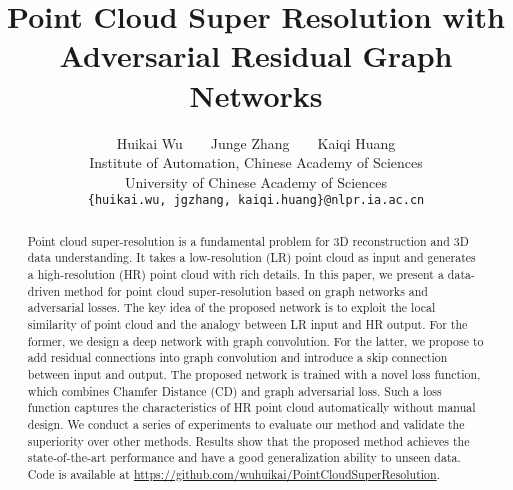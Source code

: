 \documentclass[10pt,twocolumn,letterpaper]{article}
\begin{document}
\title{Point Cloud Super Resolution with Adversarial Residual Graph Networks}

\author{Huikai Wu~~~~Junge Zhang~~~~Kaiqi Huang\\
Institute of Automation, Chinese Academy of Sciences\\
University of Chinese Academy of Sciences\\
{\tt\small\{huikai.wu, jgzhang, kaiqi.huang\}@nlpr.ia.ac.cn}
}

\maketitle



\begin{abstract}
Point cloud super-resolution is a fundamental problem for 3D reconstruction and 3D data understanding.
It takes a low-resolution (LR) point cloud as input and generates a high-resolution (HR) point cloud with rich details.
In this paper, we present a data-driven method for point cloud super-resolution based on graph networks and adversarial losses.
The key idea of the proposed network is to exploit the local similarity of point cloud and the analogy between LR input and HR output.
For the former, we design a deep network with graph convolution.
For the latter, we propose to add residual connections into graph convolution and introduce a skip connection between input and output.
The proposed network is trained with a novel loss function, which combines Chamfer Distance (CD) and graph adversarial loss.
Such a loss function captures the characteristics of HR point cloud automatically without manual design.
We conduct a series of experiments to evaluate our method and validate the superiority over other methods.
Results show that the proposed method achieves the state-of-the-art performance and have a good generalization ability to unseen data.
Code is available at \url{https://github.com/wuhuikai/PointCloudSuperResolution}.
\end{abstract}
\end{document}
